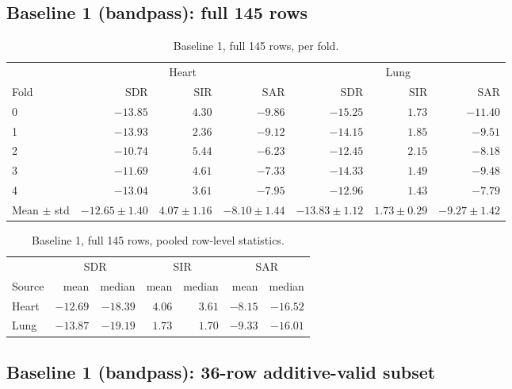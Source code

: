 \documentclass[11pt]{article}
\begin{document}
\subsection{Baseline 1 (bandpass): full 145 rows}

\begin{table}[H]
\centering
\caption{Baseline 1, full 145 rows, per fold.}
\small
\begin{tabular}{@{}lrrrrrr@{}}
\toprule
& \multicolumn{3}{c}{Heart} & \multicolumn{3}{c}{Lung} \\
Fold & SDR & SIR & SAR & SDR & SIR & SAR \\
\midrule
0 & $-13.85$ & $4.30$ & $-9.86$  & $-15.25$ & $1.73$ & $-11.40$ \\
1 & $-13.93$ & $2.36$ & $-9.12$  & $-14.15$ & $1.85$ & $-9.51$ \\
2 & $-10.74$ & $5.44$ & $-6.23$  & $-12.45$ & $2.15$ & $-8.18$ \\
3 & $-11.69$ & $4.61$ & $-7.33$  & $-14.33$ & $1.49$ & $-9.48$ \\
4 & $-13.04$ & $3.61$ & $-7.95$  & $-12.96$ & $1.43$ & $-7.79$ \\
\midrule
Mean $\pm$ std & $-12.65\pm1.40$ & $4.07\pm1.16$ & $-8.10\pm1.44$ & $-13.83\pm1.12$ & $1.73\pm0.29$ & $-9.27\pm1.42$ \\
\bottomrule
\end{tabular}
\end{table}

\begin{table}[H]
\centering
\caption{Baseline 1, full 145 rows, pooled row-level statistics.}
\small
\begin{tabular}{@{}lrrrrrr@{}}
\toprule
& \multicolumn{2}{c}{SDR} & \multicolumn{2}{c}{SIR} & \multicolumn{2}{c}{SAR} \\
Source & mean & median & mean & median & mean & median \\
\midrule
Heart & $-12.69$ & $-18.39$ & $4.06$ & $3.61$ & $-8.15$ & $-16.52$ \\
Lung  & $-13.87$ & $-19.19$ & $1.73$ & $1.70$ & $-9.33$ & $-16.01$ \\
\bottomrule
\end{tabular}
\end{table}

\subsection{Baseline 1 (bandpass): 36-row additive-valid subset}
\end{document}
